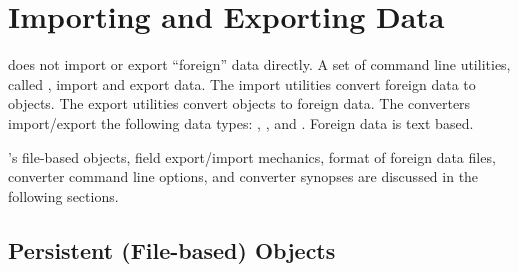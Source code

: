 %
% 
% 
% 
% 
% 
%


\chapter{Importing and Exporting \sr{} Data}
\label{ch:import_export} 

\sr{} does not import or export ``foreign'' data directly. A set of
command line utilities, called , import and export
data.  The import utilities convert foreign data to \sr{}  
objects.  The export utilities convert \sr{} objects to
foreign data. The converters import/export the following \sr{} data
types: , , and .
Foreign data is text based.

\sr{}'s file-based objects, field export/import mechanics, format of
foreign data files, converter command line options, and converter
synopses are discussed in the following sections.


\section{\sr{} Persistent (File-based) Objects}
\label{sec:sr_file_object}


